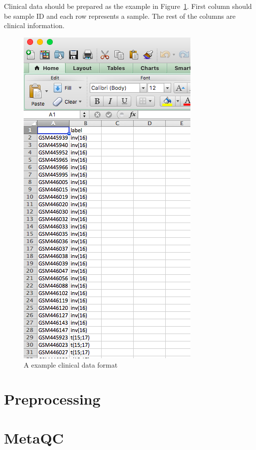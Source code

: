 \documentclass{article}
\begin{document}
Clinical data should be prepared as the example in Figure~\ref{fig:clinical}.
First column should be sample ID and each row represents a sample.
The rest of the columns are clinical information.

\begin{figure}[htbp]
\begin{center}
\includegraphics[scale=0.5]{./figure/clinicalData}
\caption{A example clinical data format}
\label{fig:clinical}
\end{center}
\end{figure}



\section{Preprocessing}

\section{MetaQC}
\end{document}

